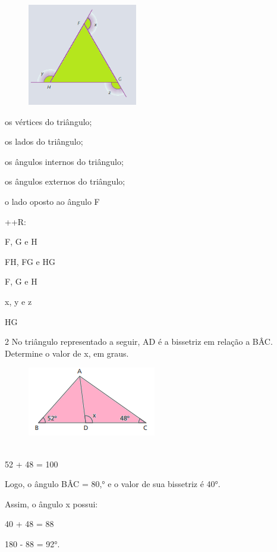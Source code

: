 \begin{figure}[H]
\centering\includegraphics[width=1.88333in,height=1.75048in]{./imgSAEB_8_MAT/media/image13.png}
\end{figure}
\item os vértices do triângulo;
\item os lados do triângulo;
\item os ângulos internos do triângulo;
\item os ângulos externos do triângulo;
\item o lado oposto ao ângulo F

++R:
\item F, G e H
\item FH, FG e HG
\item F, G e H
\item x, y e z
\item HG

\num{2} No triângulo representado a seguir, AD é a bissetriz em relação a
BÂC. Determine o valor de x, em graus.

\begin{figure}[H]
\centering\includegraphics[width=2.20833in,height=1.1875in]{./imgSAEB_8_MAT/media/image14.png}
\end{figure}

\\

52 + 48 = 100

Logo, o ângulo BÂC = 80,° e o valor de sua bissetriz é 40°.

Assim, o ângulo x possui:

40 + 48 = 88

180 - 88 = 92°.

